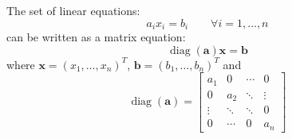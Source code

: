 \documentclass[12pt]{scrartcl}
\DeclareMathOperator{\diag}{diag}
\renewcommand*{\vec}[1]{\boldsymbol{#1}}
\begin{document}
The set of linear equations:
\[
a_ix_i = b_i  \qquad \forall i=1, \ldots, n
\]
can be written as a matrix equation:
\[
\diag(\vec{a})\vec{x} = \vec{b}
\]
where $\vec{x} = (x_1, \ldots, x_n)^T$, $\vec{b} = (b_1, \ldots, b_n)^T$
and
\[
\diag(\vec{a}) = 
\begin{bmatrix}
a_1 & 0 & \cdots & 0\\
0 & a_2 & \ddots & \vdots\\
\vdots & \ddots & \ddots & 0\\
0 & \cdots & 0 & a_n
\end{bmatrix}
\]
\end{document}
